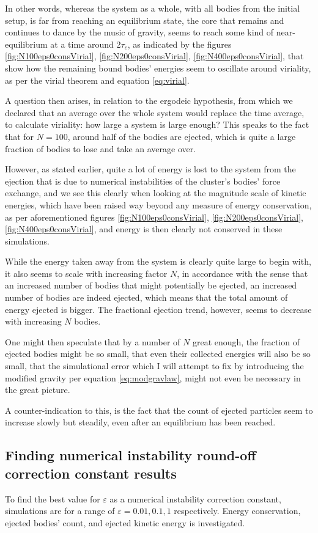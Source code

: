 \documentclass[11pt,a4paper,notitlepage,twocolumn]{article}
\begin{document}
In other words, whereas the system as a whole, with all bodies from the initial setup, is far from reaching an equilibrium state, the core that remains and continues to dance by the music of gravity, seems to reach some kind of near-equilibrium at a time around 2$\tau_c$, as indicated by the figures \ref{fig:N100eps0consVirial}, \ref{fig:N200eps0consVirial}, \ref{fig:N400eps0consVirial}, that show how the remaining bound bodies' energies seem to oscillate around viriality, as per the virial theorem and equation \ref{eq:virial}.

A question then arises, in relation to the ergodeic hypothesis, from which we declared that an average over the whole system would replace the time average, to calculate viriality: how large a system is large enough? This speaks to the fact that for $N = 100$, around half of the bodies are ejected, which is quite a large fraction of bodies to lose and take an average over.

However, as stated earlier, quite a lot of energy is lost to the system from the ejection that is due to numerical instabilities of the cluster's bodies' force exchange, and we see this clearly when looking at the magnitude scale of kinetic energies, which have been raised way beyond any measure of energy conservation, as per aforementioned figures \ref{fig:N100eps0consVirial}, \ref{fig:N200eps0consVirial}, \ref{fig:N400eps0consVirial}, and energy is then clearly not conserved in these simulations.

While the energy taken away from the system is clearly quite large to begin with, it also seems to scale with increasing factor $N$, in accordance with the sense that an increased number of bodies that might potentially be ejected, an increased number of bodies are indeed ejected, which means that the total amount of energy ejected is bigger. The fractional ejection trend, however, seems to decrease with increasing $N$ bodies.

One might then speculate that by a number of $N$ great enough, the fraction of ejected bodies might be so small, that even their collected energies will also be so small, that the simulational error which I will attempt to fix by introducing the modified gravity per equation \ref{eq:modgravlaw}, might not even be necessary in the great picture.

A counter-indication to this, is the fact that the count of ejected particles seem to increase slowly but steadily, even after an equilibrium has been reached.

\subsection{Finding numerical instability round-off correction constant results}
To find the best value for $\varepsilon$ as a numerical instability correction constant, simulations are for a range of $\varepsilon = 0.01, 0.1, 1$ respectively. Energy conservation, ejected bodies' count, and ejected kinetic energy is investigated.
\end{document}
